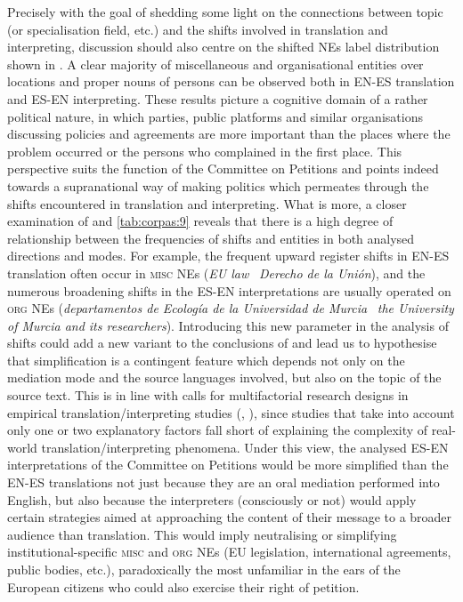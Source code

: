 \documentclass[output=paper]{langscibook}
\begin{document}
Precisely with the goal of shedding some light on the connections between topic (or specialisation field, etc.) and the shifts involved in translation and interpreting, discussion should also centre on the shifted NEs label distribution shown in . A clear majority of miscellaneous and organisational entities over locations and proper nouns of persons can be observed both in EN-ES translation and ES-EN interpreting. These results picture a cognitive domain of a rather political nature, in which parties, public platforms and similar organisations discussing policies and agreements are more important than the places where the problem occurred or the persons who complained in the first place. This perspective suits the function of the Committee on Petitions and points indeed towards a supranational way of making politics which permeates through the shifts encountered in translation and interpreting. What is more, a closer examination of  and \ref{tab:corpas:9} reveals that there is a high degree of relationship between the frequencies of shifts and entities in both analysed directions and modes. For example, the frequent upward register shifts in EN-ES translation often occur in \textsc{misc} NEs (\textit{EU law} \rightarrow$\,$ \textit{Derecho de la Unión}), and the numerous broadening shifts in the ES-EN interpretations are usually operated on \textsc{org} NEs (\textit{departamentos de Ecología de la Universidad de Murcia} \rightarrow$\,$ \textit{the University of Murcia and its researchers}). Introducing this new parameter in the analysis of shifts could add a new variant to the conclusions of \citet{FerraresiEtAl2018} and lead us to hypothesise that simplification is a contingent feature which depends not only on the mediation mode and the source languages involved, but also on the topic of the source text. This is in line with calls for multifactorial research designs in empirical translation/interpreting studies (\cite{CorpasPastor2008}, \cite{DeSutterLefer2020}), since studies that take into account only one or two explanatory factors fall short of explaining the complexity of real-world translation/interpreting phenomena. Under this view, the analysed ES-EN interpretations of the Committee on Petitions would be more simplified than the EN-ES translations not just because they are an oral mediation performed into English, but also because the interpreters (consciously or not) would apply certain strategies aimed at approaching the content of their message to a broader audience than translation. This would imply neutralising or simplifying institutional-specific \textsc{misc} and \textsc{org} NEs (EU legislation, international agreements, public bodies, etc.), paradoxically the most unfamiliar in the ears of the European citizens who could also exercise their right of petition.
\end{document}
